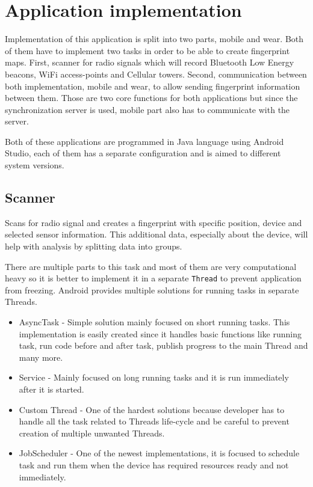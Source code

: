 
\section{Application implementation}\label{sec:ApplicationImplementation}
Implementation of this application is split into two parts, mobile and wear. Both of them have to implement two tasks in order to be able to create fingerprint maps. First, scanner for radio signals which will record Bluetooth Low Energy beacons, WiFi access-points and Cellular towers. Second, communication between both implementation, mobile and wear, to allow sending fingerprint information between them. Those are two core functions for both applications but since the synchronization server is used, mobile part also has to communicate with the server.

Both of these applications are programmed in Java language using Android Studio, each of them has a separate configuration and is aimed to different system versions.

\subsection{Scanner}\label{subsec:Scanner}
Scans for radio signal and creates a fingerprint with specific position, device and selected sensor information. This additional data, especially about the device, will help with analysis by splitting data into groups.

There are multiple parts to this task and most of them are very computational heavy so it is better to implement it in a separate \verb|Thread| to prevent application from freezing. Android provides multiple solutions for running tasks in separate Threads.

\begin{itemize}
	\item AsyncTask - Simple solution mainly focused on short running tasks. This implementation is easily created since it handles basic functions like running task, run code before and after task, publish progress to the main Thread and many more.
	\item Service - Mainly focused on long running tasks and it is run immediately after it is started.
	\item Custom Thread - One of the hardest solutions because developer has to handle all the task related to Threads life-cycle and be careful to prevent creation of multiple unwanted Threads.
	\item JobScheduler - One of the newest implementations, it is focused to schedule task and run them when the device has required resources ready and not immediately.
\end{itemize}

